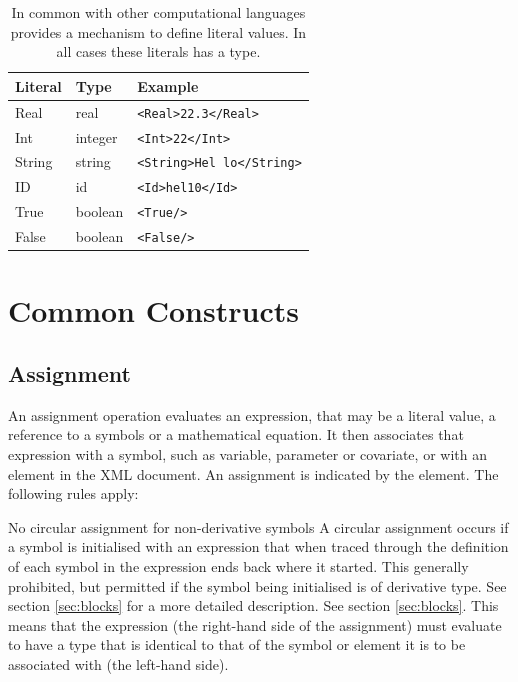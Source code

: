 \begin{table}[ht!]
\begin{center}
\small
\begin{tabular}{lll}\toprule
Literal & Type & Example \\\midrule
Real & real & \verb|<Real>22.3</Real>|\\
Int & integer & \verb|<Int>22</Int>|\\
String & string & \verb|<String>Hel lo</String>|\\
ID & id & \verb|<Id>hel10</Id>|\\
True & boolean & \verb|<True/>|\\
False & boolean & \verb|<False/>|\\\bottomrule
\end{tabular}
\end{center}
\caption{In common with other computational languages \pharmml provides a
mechanism to define literal values. In all cases these literals has a
type.}
\label{tab:literal-types}
\end{table}%


\section{Common Constructs}

\subsection{Assignment}
\label{subsec:AssinmentRules}

An assignment operation evaluates an expression, that may be a literal
value, a reference to a symbols or a mathematical equation. It then
associates that expression with a symbol, such as variable, parameter
or covariate, or with an element in the XML document. An assignment is
indicated by the  element. The following rules apply:

\begin{valrules}
   {No circular assignment for non-derivative symbols} A
  circular assignment occurs if a symbol is initialised with an
  expression that when traced through the definition of each symbol in
  the expression ends back where it started. This generally
  prohibited, but permitted if the symbol being initialised is of
  derivative type. See section \ref{sec:blocks} for a more detailed
  description.
%
   See section
  \ref{sec:blocks}.
%
This means that the expression (the right-hand side of the assignment)
must evaluate to have a type that is identical to that of the symbol
or element it is to be associated with (the left-hand side).
\end{valrules}

